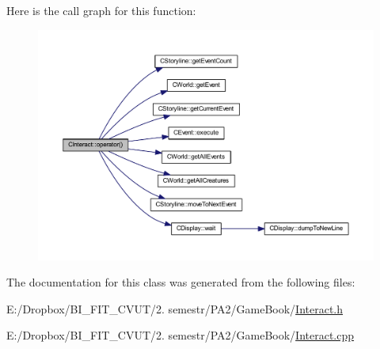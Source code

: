 Here is the call graph for this function\+:\nopagebreak
\begin{figure}[H]
\begin{center}
\leavevmode
\includegraphics[width=350pt]{class_c_interact_a9cfd2b170a9bed7f6a5a68b82c83d5bd_cgraph}
\end{center}
\end{figure}


The documentation for this class was generated from the following files\+:\begin{DoxyCompactItemize}
\item 
E\+:/\+Dropbox/\+B\+I\+\_\+\+F\+I\+T\+\_\+\+C\+V\+U\+T/2. semestr/\+P\+A2/\+Game\+Book/\mbox{\hyperlink{_interact_8h}{Interact.\+h}}\item 
E\+:/\+Dropbox/\+B\+I\+\_\+\+F\+I\+T\+\_\+\+C\+V\+U\+T/2. semestr/\+P\+A2/\+Game\+Book/\mbox{\hyperlink{_interact_8cpp}{Interact.\+cpp}}\end{DoxyCompactItemize}
